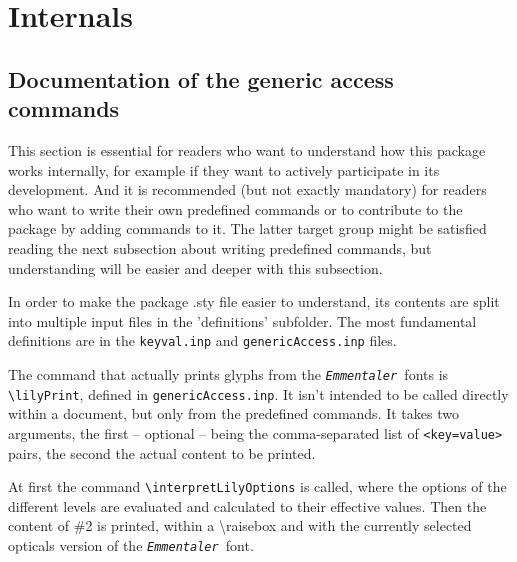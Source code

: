 \documentclass{article}
\newcommand*{\emmentaler}{\texttt{\textit{Emmentaler }}}
\newcommand*{\cmd}[1]{\texttt{\textbackslash #1}}
\begin{document}
\section{Internals}
\label{sec:internatls}

\subsection{Documentation of the generic access commands}
\label{subsec:internals_generic_access}
This section is essential for readers who want to understand how this package works internally, for example if they want to actively participate in its development.
And it is recommended (but not exactly mandatory) for readers who want to write their own predefined commands or to contribute to the package by adding commands to it. 
The latter target group might be satisfied reading the next subsection about writing predefined commands, but understanding will be easier and deeper with this subsection.

\medskip
In order to make the package .sty file easier to understand, its contents are split into multiple input files in the 'definitions' subfolder. 
The most fundamental definitions are in the \texttt{keyval.inp} and \texttt{genericAccess.inp} files.

\medskip
The command that actually prints glyphs from the \emmentaler fonts is \cmd{lilyPrint}, defined in \texttt{genericAccess.inp}.
It isn't intended to be called directly within a document, but only from the predefined commands.
It takes two arguments, the first -- optional -- being the comma-separated list of \texttt{<key=value>} pairs, the second the actual content to be printed.

At first the command \cmd{interpretLilyOptions} is called, where the options of the different levels are evaluated and calculated to their effective values.
Then the content of \#2 is printed, within a \textbackslash raisebox and with the currently selected opticals version of the \emmentaler font.
\end{document}
